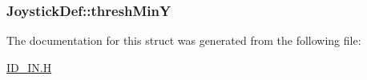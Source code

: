 \label{structJoystickDef_aa9e7a143ebd6e4f382a5d649f7a60fcc}
\hypertarget{structJoystickDef_a2414d25acd6aeed35ef60778a71e3a09}{
\subsubsection[{threshMinY}]{ {\bf JoystickDef::threshMinY}}}
\label{structJoystickDef_a2414d25acd6aeed35ef60778a71e3a09}


The documentation for this struct was generated from the following file:\begin{DoxyCompactItemize}
\item 
\hyperlink{ID__IN_8H}{ID\_\-IN.H}\end{DoxyCompactItemize}
